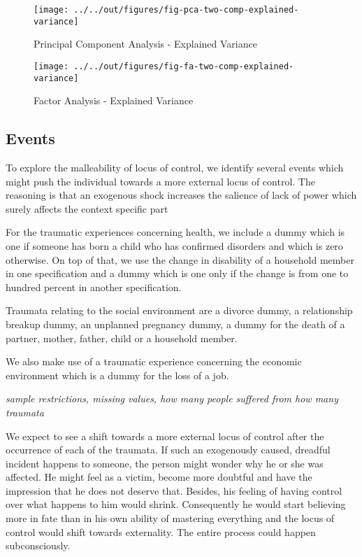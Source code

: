 \documentclass[12pt, a4paper, fleqn, parskip]{scrartcl}
\begin{document}
\begin{figure}[ht!]
	\centering
	\texttt{[image: ../../out/figures/fig-pca-two-comp-explained-variance]}
	\caption{Principal Component Analysis - Explained Variance}
	\label{fig:pca_ev}
\end{figure}

\begin{figure}[ht!]
	\centering
	\texttt{[image: ../../out/figures/fig-fa-two-comp-explained-variance]}
	\caption{Factor Analysis - Explained Variance}
	\label{fig:fa_ev}
\end{figure}



\subsection{Events} %
\label{sub:events}

To explore the malleability of locus of control, we identify several events
which might push the individual towards a more external locus of control. The
reasoning is that an exogenous shock increases the salience of lack of power
which surely affects the context specific part


For the traumatic experiences concerning health, we include a dummy which is
one if someone has born a child who has confirmed disorders and which is zero
otherwise. On top of that, we use the change in disability of a household
member in one specification and a dummy which is one only if the change is from
one to hundred percent in another specification.

Traumata relating to the social environment are a divorce dummy, a relationship
breakup dummy, an unplanned pregnancy dummy, a dummy for the death of a
partner, mother, father, child or a household member.

We also make use of a traumatic experience concerning the economic environment
which is a dummy for the loss of a job.

\textit{sample restrictions, missing values, how many people suffered from how
many traumata}

We expect to see a shift towards a more external locus of control after the
occurrence of each of the traumata. If such an exogenously caused, dreadful
incident happens to someone, the person might wonder why he or she was
affected. He might feel as a victim, become more doubtful and have the
impression that he does not deserve that. Besides, his feeling of having
control over what happens to him would shrink. Consequently he would start
believing more in fate than in his own ability of mastering everything and the
locus of control would shift towards externality. The entire process could
happen subconsciously.
\end{document}
